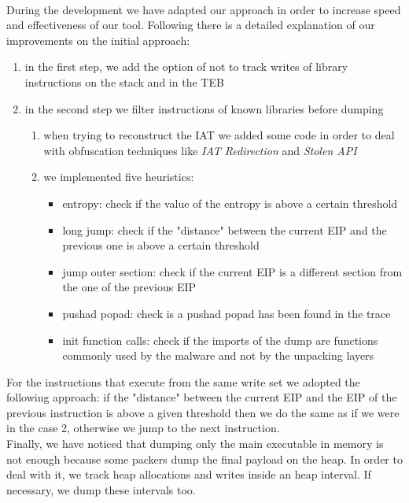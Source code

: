 \paragraph{}
During the development we have adapted our approach in order to increase speed and effectiveness of our tool. Following there is a detailed explanation of our improvements on the initial approach:
\begin{enumerate}
\item in the first step, we add the option of not to track writes of library instructions on the stack and in the TEB
\item in the second step we filter instructions of known libraries before dumping
	\begin{enumerate}
	\item when trying to reconstruct the IAT we added some code in order to deal with 			obfuscation techniques like \textit{IAT Redirection} and \textit{Stolen API}
	\item we implemented five heuristics:
		\begin{itemize}
		\item entropy: check if the value of the entropy is above a certain threshold
		\item long jump: check if the "distance" between the current EIP and the previous 			one is above a certain threshold
		\item jump outer section: check if the current EIP is a different section from the 		one of the previous EIP
		\item pushad popad: check is a pushad popad has been found in the trace
		\item init function calls: check if the imports of the dump are functions commonly 			 used by the malware and not by the unpacking layers
		\end{itemize}
	\end{enumerate}
\end{enumerate} 
For the instructions that execute from the same write set we adopted the following approach: if the "distance" between the current EIP and the EIP of the previous instruction is above a given threshold then we do the same as if we were in the case 2, otherwise we jump to the next instruction.\\
Finally, we have noticed that dumping only the main executable in memory is not enough because some packers dump the final payload on the heap. In order to deal with it, we track heap allocations and writes inside an heap interval. If necessary, we dump these intervals too.

